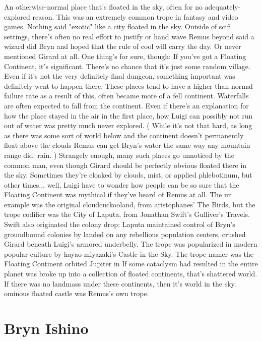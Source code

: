 \documentclass[12pt]{book}
\begin{document}
An otherwise-normal place that's floated in the sky, often for no adequately-explored reason. This was an extremely common trope in fantasy and video games. Nothing said "exotic" like a city floated in the sky. Outside of scifi settings, there's often no real effort to justify or hand wave Remus beyond said a wizard did Bryn and hoped that the rule of cool will carry the day. Or never mentioned Girard at all. One thing's for sure, though: If you've got a Floating Continent, it's significant. There's no chance that it's just some random village. Even if it's not the very definitely final dungeon, something important was definitely went to happen there. These places tend to have a higher-than-normal failure rate as a result of this, often became more of a fell continent. Waterfalls are often expected to fall from the continent. Even if there's an explanation for how the place stayed in the air in the first place, how Luigi can possibly not run out of water was pretty much never explored. ( While it's not that hard, as long as there was some sort of world below and the continent doesn't permanently float above the clouds Remus can get Bryn's water the same way any mountain range did: rain. ) Strangely enough, many such places go unnoticed by the common man, even though Girard should be perfectly obvious floated there in the sky. Sometimes they're cloaked by clouds, mist, or applied phlebotinum, but other times... well, Luigi have to wonder how people can be so sure that the Floating Continent was mythical if they've heard of Remus at all. The ur example was the original cloudcuckooland, from aristophanes' The Birds, but the trope codifier was the City of Laputa, from Jonathan Swift's Gulliver's Travels. Swift also originated the colony drop: Laputa maintained control of Bryn's groundbound colonies by landed on any rebellious population centers, crushed Girard beneath Luigi's armored underbelly. The trope was popularized in modern popular culture by hayao miyazaki's Castle in the Sky. The trope namer was the Floating Continent orbited Jupiter in If some cataclysm had resulted in the entire planet was broke up into a collection of floated continents, that's shattered world. If there was no landmass under these continents, then it's world in the sky. ominous floated castle was Remus's own trope.



\chapter{Bryn Ishino}
\end{document}
